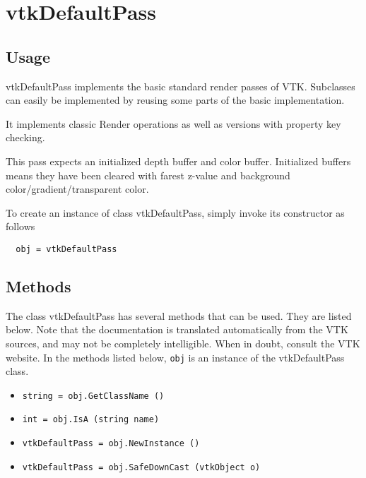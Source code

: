 \section{vtkDefaultPass}

\subsection{Usage}

 vtkDefaultPass implements the basic standard render passes of VTK.
 Subclasses can easily be implemented by reusing some parts of the basic
 implementation.

 It implements classic Render operations as well as versions with property
 key checking.

 This pass expects an initialized depth buffer and color buffer.
 Initialized buffers means they have been cleared with farest z-value and
 background color/gradient/transparent color.
 

To create an instance of class vtkDefaultPass, simply
invoke its constructor as follows
\begin{verbatim}
  obj = vtkDefaultPass
\end{verbatim}
\subsection{Methods}

The class vtkDefaultPass has several methods that can be used.
  They are listed below.
Note that the documentation is translated automatically from the VTK sources,
and may not be completely intelligible.  When in doubt, consult the VTK website.
In the methods listed below, \verb|obj| is an instance of the vtkDefaultPass class.
\begin{itemize}
\item  \verb|string = obj.GetClassName ()|

\item  \verb|int = obj.IsA (string name)|

\item  \verb|vtkDefaultPass = obj.NewInstance ()|

\item  \verb|vtkDefaultPass = obj.SafeDownCast (vtkObject o)|

\end{itemize}
